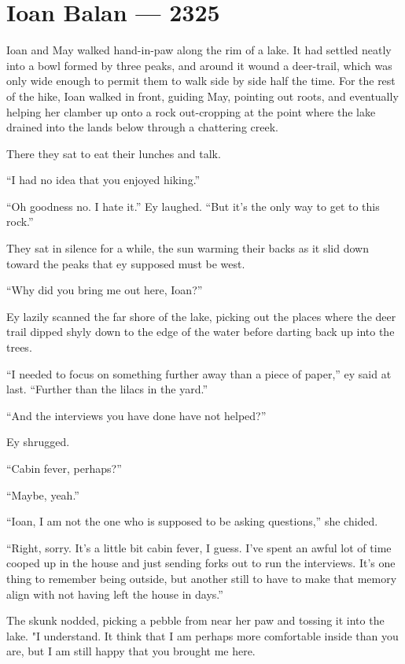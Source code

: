 \hypertarget{ioan-balan-2325}{%
\chapter{Ioan Balan — 2325}\label{ioan-balan-2325}}

Ioan and May walked hand-in-paw along the rim of a lake. It had settled neatly into a bowl formed by three peaks, and around it wound a deer-trail, which was only wide enough to permit them to walk side by side half the time. For the rest of the hike, Ioan walked in front, guiding May, pointing out roots, and eventually helping her clamber up onto a rock out-cropping at the point where the lake drained into the lands below through a chattering creek.

There they sat to eat their lunches and talk.

``I had no idea that you enjoyed hiking.''

``Oh goodness no. I hate it.'' Ey laughed. ``But it's the only way to get to this rock.''

They sat in silence for a while, the sun warming their backs as it slid down toward the peaks that ey supposed must be west.

``Why did you bring me out here, Ioan?''

Ey lazily scanned the far shore of the lake, picking out the places where the deer trail dipped shyly down to the edge of the water before darting back up into the trees.

``I needed to focus on something further away than a piece of paper,'' ey said at last. ``Further than the lilacs in the yard.''

``And the interviews you have done have not helped?''

Ey shrugged.

``Cabin fever, perhaps?''

``Maybe, yeah.''

``Ioan, I am not the one who is supposed to be asking questions,'' she chided.

``Right, sorry. It's a little bit cabin fever, I guess. I've spent an awful lot of time cooped up in the house and just sending forks out to run the interviews. It's one thing to remember being outside, but another still to have to make that memory align with not having left the house in days.''

The skunk nodded, picking a pebble from near her paw and tossing it into the lake. "I understand. It think that I am perhaps more comfortable inside than you are, but I am still happy that you brought me here.

